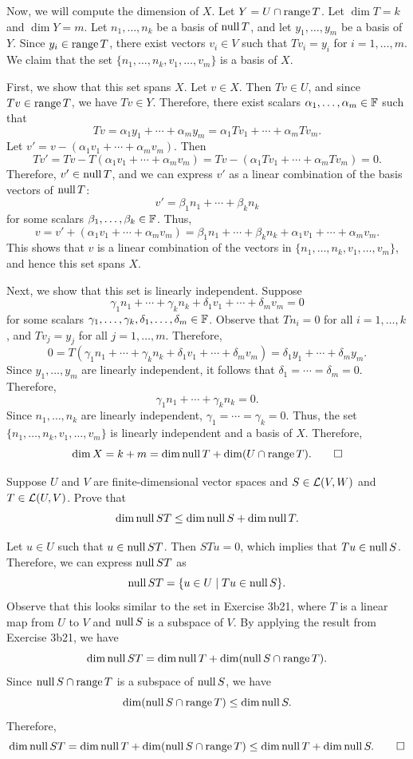 \begin{exc}
\begin{solution}
Now, we will compute the dimension of $X$. Let $Y=U\cap\operatorname{range} T$. Let
$\dim T=k$ and $\dim Y=m$. Let $n_1,\dots,n_k$ be a basis of $\operatorname{null} T$, and let
$y_1,\dots,y_m$ be a basis of $Y$. Since $y_i\in\operatorname{range} T$, there exist vectors
$v_i\in V$ such that $Tv_i=y_i$ for $i=1,\dots,m$. We claim that the set
$\{n_1,\dots,n_k,v_1,\dots,v_m\}$ is a basis of $X$.

First, we show that this set spans $X$. Let $v\in X$. Then $Tv\in U$, and since
$Tv\in\operatorname{range} T$, we have $Tv\in Y$. Therefore, there exist scalars
$\alpha_1,\dots,\alpha_m\in\mathbb{F}$ such that
\[ Tv=\alpha_1y_1+\cdots+\alpha_my_m=\alpha_1Tv_1+\cdots+\alpha_mTv_m. \]
Let $v'=v-(\alpha_1v_1+\cdots+\alpha_mv_m)$. Then
\[ Tv'=Tv-T(\alpha_1v_1+\cdots+\alpha_mv_m)
   =Tv-(\alpha_1Tv_1+\cdots+\alpha_mTv_m)=0. \]
Therefore, $v'\in\operatorname{null} T$, and we can express $v'$ as a linear combination of the
basis vectors of $\operatorname{null} T$:
\[ v'=\beta_1n_1+\cdots+\beta_kn_k \]
for some scalars $\beta_1,\dots,\beta_k\in\mathbb{F}$. Thus,
\[ v=v'+(\alpha_1v_1+\cdots+\alpha_mv_m)
   =\beta_1n_1+\cdots+\beta_kn_k+\alpha_1v_1+\cdots+\alpha_mv_m. \]
This shows that $v$ is a linear combination of the vectors in
$\{n_1,\dots,n_k,v_1,\dots,v_m\}$, and hence this set spans $X$.

Next, we show that this set is linearly independent. Suppose
\[ \gamma_1n_1+\cdots+\gamma_kn_k+\delta_1v_1+\cdots+\delta_mv_m=0 \]
for some scalars $\gamma_1,\dots,\gamma_k,\delta_1,\dots,\delta_m\in\mathbb{F}$. Observe
that $Tn_i=0$ for all $i=1,\dots,k$, and $Tv_j=y_j$ for all $j=1,\dots,m$.
Therefore,
\[ 0=T(\gamma_1n_1+\cdots+\gamma_kn_k+\delta_1v_1+\cdots+\delta_mv_m)
   =\delta_1y_1+\cdots+\delta_my_m. \]
Since $y_1,\dots,y_m$ are linearly independent, it follows that
$\delta_1=\cdots=\delta_m=0$. Therefore,
\[ \gamma_1n_1+\cdots+\gamma_kn_k=0. \]
Since $n_1,\dots,n_k$ are linearly independent, $\gamma_1=\cdots=\gamma_k=0$.
Thus, the set $\{n_1,\dots,n_k,v_1,\dots,v_m\}$ is linearly independent and a
basis of $X$. Therefore,
\[ \operatorname{dim} X=k+m=\operatorname{dim}\operatorname{null} T+\operatorname{dim}(U\cap\operatorname{range} T). \qedhere \]
\end{solution}

\begin{exercise}
Suppose $U$ and $V$ are finite-dimensional vector spaces and $S\in\mathcal{L}(V,W)$
and $T\in\mathcal{L}(U,V)$. Prove that
\[ \operatorname{dim}\operatorname{null} ST\le\operatorname{dim}\operatorname{null} S+\operatorname{dim}\operatorname{null} T. \]
\end{exercise}
\begin{solution}
Let $u\in U$ such that $u\in\operatorname{null} ST$. Then $STu=0$, which implies that
$Tu\in\operatorname{null} S$. Therefore, we can express $\operatorname{null} ST$ as
\[ \operatorname{null} ST=\{u\in U\mid Tu\in\operatorname{null} S\}. \]
Observe that this looks similar to the set in Exercise 3b21, where $T$ is a
linear map from $U$ to $V$ and $\operatorname{null} S$ is a subspace of $V$. By applying the
result from Exercise 3b21, we have
\[ \operatorname{dim}\operatorname{null} ST=\operatorname{dim}\operatorname{null} T+\operatorname{dim}(\operatorname{null} S\cap\operatorname{range} T). \]
Since $\operatorname{null} S\cap\operatorname{range} T$ is a subspace of $\operatorname{null} S$, we have
\[ \operatorname{dim}(\operatorname{null} S\cap\operatorname{range} T)\le\operatorname{dim}\operatorname{null} S. \]
Therefore,
\[ \operatorname{dim}\operatorname{null} ST=\operatorname{dim}\operatorname{null} T+\operatorname{dim}(\operatorname{null} S\cap\operatorname{range} T)\le\operatorname{dim}\operatorname{null} T+\operatorname{dim}\operatorname{null} S.
   \qedhere \]
\end{solution}


\end{exc}

